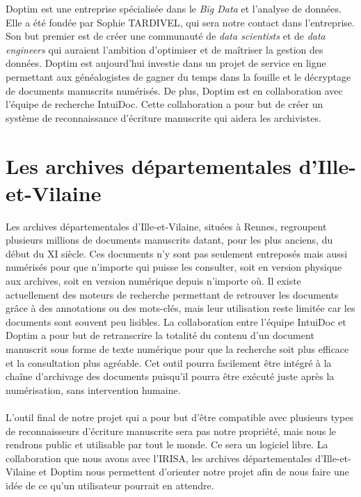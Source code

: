 Doptim est une entreprise spécialisée dans le \textit{Big Data} et l’analyse de données.
Elle a été fondée par Sophie TARDIVEL, qui sera notre contact dans l’entreprise.
Son but premier est de créer une communauté de \textit{data scientists} et de
\textit{data engineers} qui auraient l’ambition d’optimiser et de maîtriser la gestion
des données. Doptim est aujourd’hui investie dans un projet de service en ligne permettant
aux généalogistes de gagner du temps dans la fouille et le décryptage de documents manuscrits
numérisés. De plus, Doptim est en collaboration avec l’équipe de recherche IntuiDoc. Cette
collaboration a pour but de créer un système de reconnaissance d’écriture manuscrite qui aidera
les archivistes.

\newpage

\section{Les archives départementales d’Ille-et-Vilaine}

Les archives départementales d’Ille-et-Vilaine, situées à Rennes, regroupent plusieurs
millions de documents manuscrits datant, pour les plus anciens, du début du XI siècle.
Ces documents n’y sont pas seulement entreposés mais aussi numérisés pour que n’importe qui
puisse les consulter, soit en version physique aux archives, soit en version numérique
depuis n’importe où. Il existe actuellement des moteurs de recherche permettant de retrouver
les documents grâce à des annotations ou des mots-clés, mais leur utilisation reste limitée
car les documents sont souvent peu lisibles. La collaboration entre l'équipe IntuiDoc et Doptim
a pour but de retranscrire la totalité du contenu d’un document manuscrit sous forme de
texte numérique pour que la recherche soit plus efficace et la consultation plus agréable.
Cet outil pourra facilement être intégré à la chaîne d’archivage des documents puisqu’il pourra
être exécuté juste après la numérisation, sans intervention humaine.

\paragraph{}
L’outil final de notre projet qui a pour but d’être compatible avec plusieurs types de
reconnaisseurs d’écriture manuscrite sera pas notre propriété, mais nous le rendrons public et
utilisable par tout le monde. Ce sera un logiciel libre. La collaboration que nous avons avec
l’IRISA, les archives départementales d’Ille-et-Vilaine et Doptim nous permettent d’orienter
notre projet afin de nous faire une idée de ce qu’un utilisateur pourrait en attendre.